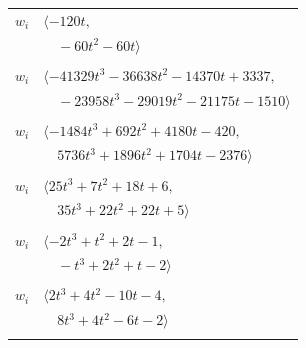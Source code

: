 \documentclass[11pt]{article}
\begin{document}
\begin{longtable}{@{}ll@{}}
$w_i$ & $\langle -120t,$\\
 & $\quad -60t^{2}-60t\rangle$\\
\addlinespace[2pt]
\multicolumn{2}{@{}p{0.97\textwidth}@{}}{$i=27$, $D_i=2048$, $\rho_{ij}$: $2{:}2, \allowbreak 4{:}1, \allowbreak 12{:}2, \allowbreak 14{:}2, \allowbreak 15{:}2, \allowbreak 16{:}2, \allowbreak 17{:}1, \allowbreak 33{:}1, \allowbreak 36{:}2, \allowbreak 38{:}1, \allowbreak 47{:}2, \allowbreak 48{:}2, \allowbreak 51{:}1$}\\
$w_i$ & $\langle -41329t^{3}-36638t^{2}-14370t+3337,$\\
 & $\quad -23958t^{3}-29019t^{2}-21175t-1510\rangle$\\
\addlinespace[2pt]
\multicolumn{2}{@{}p{0.97\textwidth}@{}}{$i=28$, $D_i=512$, $\rho_{ij}$: $1{:}2, \allowbreak 5{:}2, \allowbreak 9{:}1, \allowbreak 11{:}2, \allowbreak 13{:}2, \allowbreak 15{:}1, \allowbreak 25{:}2, \allowbreak 29{:}1, \allowbreak 30{:}2, \allowbreak 37{:}2, \allowbreak 40{:}1, \allowbreak 44{:}2$}\\
$w_i$ & $\langle -1484t^{3}+692t^{2}+4180t-420,$\\
 & $\quad 5736t^{3}+1896t^{2}+1704t-2376\rangle$\\
\addlinespace[2pt]
\multicolumn{2}{@{}p{0.97\textwidth}@{}}{$i=29$, $D_i=4$, $\rho_{ij}$: $6{:}1, \allowbreak 8{:}2, \allowbreak 12{:}1, \allowbreak 25{:}1, \allowbreak 28{:}2, \allowbreak 39{:}1, \allowbreak 41{:}2, \allowbreak 46{:}2, \allowbreak 51{:}1$}\\
$w_i$ & $\langle 25t^{3}+7t^{2}+18t+6,$\\
 & $\quad 35t^{3}+22t^{2}+22t+5\rangle$\\
\addlinespace[2pt]
\multicolumn{2}{@{}p{0.97\textwidth}@{}}{$i=30$, $D_i=1$, $\rho_{ij}$: $17{:}1, \allowbreak 22{:}1, \allowbreak 28{:}1, \allowbreak 46{:}1, \allowbreak 49{:}1, \allowbreak 51{:}1, \allowbreak 59{:}2, \allowbreak 61{:}1$}\\
$w_i$ & $\langle -2t^{3}+t^{2}+2t-1,$\\
 & $\quad -t^{3}+2t^{2}+t-2\rangle$\\
\addlinespace[2pt]
\multicolumn{2}{@{}p{0.97\textwidth}@{}}{$i=31$, $D_i=4$, $\rho_{ij}$: $12{:}1, \allowbreak 14{:}2, \allowbreak 17{:}1, \allowbreak 22{:}1, \allowbreak 38{:}2, \allowbreak 42{:}1$}\\
$w_i$ & $\langle 2t^{3}+4t^{2}-10t-4,$\\
 & $\quad 8t^{3}+4t^{2}-6t-2\rangle$\\
\addlinespace[2pt]
\multicolumn{2}{@{}p{0.97\textwidth}@{}}{$i=32$, $D_i=1$, $\rho_{ij}$: $7{:}1, \allowbreak 25{:}1, \allowbreak 34{:}2, \allowbreak 48{:}2$}\\

\end{longtable}
\end{document}
